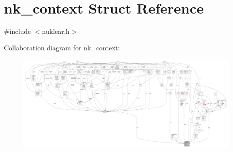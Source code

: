 \hypertarget{structnk__context}{}\section{nk\+\_\+context Struct Reference}
\label{structnk__context}


{\ttfamily \#include $<$nuklear.\+h$>$}



Collaboration diagram for nk\+\_\+context\+:
\nopagebreak
\begin{figure}[H]
\begin{center}
\leavevmode
\includegraphics[width=350pt]{structnk__context__coll__graph}
\end{center}
\end{figure}

